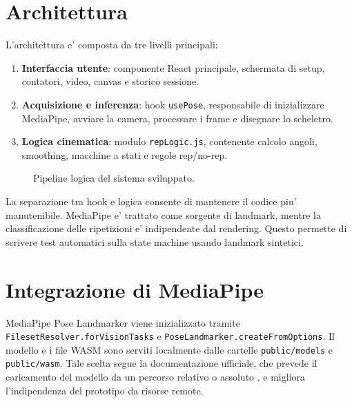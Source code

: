 \section{Architettura}

L'architettura e' composta da tre livelli principali:

\begin{enumerate}
  \item \textbf{Interfaccia utente}: componente React principale, schermata di setup, contatori, video, canvas e storico sessione.
  \item \textbf{Acquisizione e inferenza}: hook \texttt{usePose}, responsabile di inizializzare MediaPipe, avviare la camera, processare i frame e disegnare lo scheletro.
  \item \textbf{Logica cinematica}: modulo \texttt{repLogic.js}, contenente calcolo angoli, smoothing, macchine a stati e regole rep/no-rep.
\end{enumerate}

\begin{figure}[htbp]
\myfloatalign
{}
\caption{Pipeline logica del sistema sviluppato.}
\label{fig:pipeline}
\end{figure}

La separazione tra hook e logica consente di mantenere il codice piu' manutenibile. MediaPipe e' trattato come sorgente di landmark, mentre la classificazione delle ripetizioni e' indipendente dal rendering. Questo permette di scrivere test automatici sulla state machine usando landmark sintetici.

\section{Integrazione di MediaPipe}

MediaPipe Pose Landmarker viene inizializzato tramite \texttt{FilesetResolver.forVisionTasks} e \texttt{PoseLandmarker.createFromOptions}. Il modello e i file WASM sono serviti localmente dalle cartelle \texttt{public/models} e \texttt{public/wasm}. Tale scelta segue la documentazione ufficiale, che prevede il caricamento del modello da un percorso relativo o assoluto \cite{mediapipePoseWeb2026}, e migliora l'indipendenza del prototipo da risorse remote.


